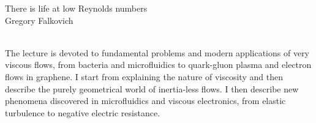     {  
			{There is life at low Reynolds numbers} \\ 			
    \normalfont\small Gregory Falkovich }
    
    {  \\    
    } 
      {  } 
	\vspace{1cm} 
	The lecture is devoted to fundamental problems and modern applications of very viscous flows, from bacteria and microfluidics to quark-gluon plasma and electron flows in graphene. I start from explaining the nature of viscosity and then describe the purely geometrical world of inertia-less flows. I then describe new phenomena discovered in microfluidics and viscous electronics, from elastic turbulence to negative electric resistance.
	
         
    \vspace{.5cm}
    \newpage
    

